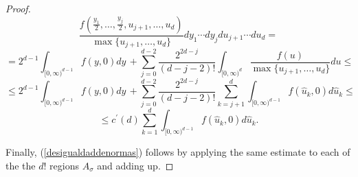 \documentclass[12pt]{amsart}
\numberwithin{equation}{section}
\theoremstyle{plain}
\theoremstyle{definition}
\theoremstyle{remark}
\begin{document}
\begin{proof}
\begin{equation*}
\frac{f(\frac{y_1}{2},\ldots,\frac{y_j}{2},u_{j+1},\ldots,u_{d})}{\max\{u_{j+1},\ldots,u_d\}}
  dy_1\cdots dy_j du_{j+1}\cdots du_d=
\end{equation*}
\begin{equation*}
=2^{d-1}
  \int_{[0,\infty)^{d-1}}f(y,0)dy\,+ \sum_{j=0}^{d-2}\frac{2^{2d-j}}{(d-j-2)!}\int_{[0,\infty)^d}
  \frac{f(u)}{\max\{u_{j+1},\ldots,u_d\}}
   du\le
\end{equation*}
\begin{equation*}
 \le 2^{d-1}
  \int_{[0,\infty)^{d-1}}f(y,0)dy\,+  \sum_{j=0}^{d-2}\frac{2^{2d-j}}{(d-j-2)!}\sum_{k=j+1}^d\int_{[0,\infty)^{d-1}}f(\hat{u}_k,0)
   d\hat{u}_k\le
\end{equation*}
\begin{equation*}
\le    c^\prime (d)\sum_{k=1}^d\int_{[0,\infty)^{d-1}}f(\hat{u}_k,0)
   d\hat{u}_k .
\end{equation*}

Finally, (\ref{desigualdaddenormas}) follows by applying the same
estimate to each of the the $d!$ regions $A_\sigma$ and adding up.

\end{proof}
\end{document}
